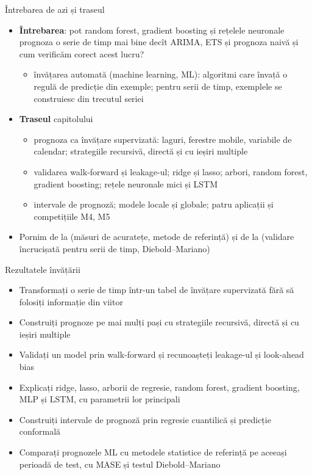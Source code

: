 \begin{frame}{Întrebarea de azi și traseul}
\itemsize{\small}
\begin{itemize}
    \item \textbf{Întrebarea}: pot random forest, gradient boosting și rețelele neuronale prognoza o serie de timp mai bine decît ARIMA, ETS și prognoza naivă și cum verificăm corect acest lucru?
    \begin{itemize}
        \item învățarea automată (machine learning, ML): algoritmi care învață o regulă de predicție din exemple; pentru serii de timp, exemplele se construiesc din trecutul seriei
    \end{itemize}
    \item \textbf{Traseul} capitolului
    \begin{itemize}
        \item prognoza ca învățare supervizată: laguri, ferestre mobile, variabile de calendar; strategiile recursivă, directă și cu ieșiri multiple
        \item validarea walk-forward și leakage-ul; ridge și lasso; arbori, random forest, gradient boosting; rețele neuronale mici și LSTM
        \item intervale de prognoză; modele locale și globale; patru aplicații și competițiile M4, M5
    \end{itemize}
    \item Pornim de la  (măsuri de acuratețe, metode de referință) și de la  (validare încrucișată pentru serii de timp, Diebold--Mariano)
\end{itemize}
\end{frame}

\begin{frame}{Rezultatele învățării}
\itemsize{\small}
\begin{itemize}
    \item Transformați o serie de timp într-un tabel de învățare supervizată fără să folosiți informație din viitor
    \item Construiți prognoze pe mai mulți pași cu strategiile recursivă, directă și cu ieșiri multiple
    \item Validați un model prin walk-forward și recunoașteți leakage-ul și look-ahead bias
    \item Explicați ridge, lasso, arborii de regresie, random forest, gradient boosting, MLP și LSTM, cu parametrii lor principali
    \item Construiți intervale de prognoză prin regresie cuantilică și predicție conformală
    \item Comparați prognozele ML cu metodele statistice de referință pe aceeași perioadă de test, cu MASE și testul Diebold--Mariano
\end{itemize}
\end{frame}

